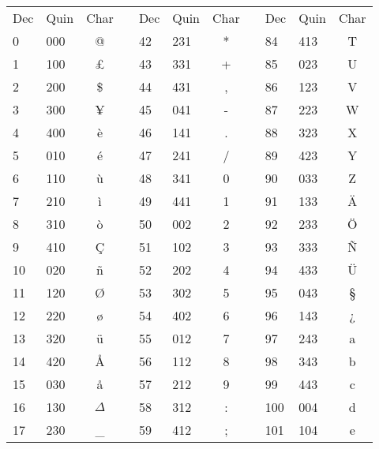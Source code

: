 \documentclass{article}
\begin{document}
{\begin{longtable}{|l|l|c|c|l|l|c|c|l|l|c|}
  \cline{1-3}
  \cline{5-7}
  \cline{9-11}
  Dec & Quin & Char & & Dec & Quin& Char& & Dec& Quin& Char\\
  \cline{1-3}
  \cline{5-7}
  \cline{9-11}
  0 & 000 & @ & & 42 & 231 & * & & 84 & 413 & T \\
  \cline{1-3}
  \cline{5-7}
  \cline{9-11}
  1 & 100 & £ & & 43 & 331 & + & & 85 & 023 & U \\
  \cline{1-3}
  \cline{5-7}
  \cline{9-11}
  2 & 200 & \$ & & 44 & 431 & , & & 86 & 123 & V \\
  \cline{1-3}
  \cline{5-7}
  \cline{9-11}
  3 & 300 & ¥ & & 45 & 041 & - & & 87 & 223 & W \\
  \cline{1-3}
  \cline{5-7}
  \cline{9-11}
  4 & 400 & è & & 46 & 141 & . & & 88 & 323 & X \\
  \cline{1-3}
  \cline{5-7}
  \cline{9-11}
  5 & 010 & é & & 47 & 241 & / & & 89 & 423 & Y \\
  \cline{1-3}
  \cline{5-7}
  \cline{9-11}
  6 & 110 & ù & & 48 & 341 & 0 & & 90 & 033 & Z \\
  \cline{1-3}
  \cline{5-7}
  \cline{9-11}
  7 & 210 & ì & & 49 & 441 & 1 & & 91 & 133 & Ä \\
  \cline{1-3}
  \cline{5-7}
  \cline{9-11}
  8 & 310 & ò & & 50 & 002 & 2 & & 92 & 233 & Ö \\
  \cline{1-3}
  \cline{5-7}
  \cline{9-11}
  9 & 410 & Ç & & 51 & 102 & 3 & & 93 & 333 & Ñ \\
  \cline{1-3}
  \cline{5-7}
  \cline{9-11}
  10 & 020 & ñ & & 52 & 202 & 4 & & 94 & 433 & Ü \\
  \cline{1-3}
  \cline{5-7}
  \cline{9-11}
  11 & 120 & Ø & & 53 & 302 & 5 & & 95 & 043 & § \\
  \cline{1-3}
  \cline{5-7}
  \cline{9-11}
  12 & 220 & ø & & 54 & 402 & 6 & & 96 & 143 & ¿ \\
  \cline{1-3}
  \cline{5-7}
  \cline{9-11}
  13 & 320 & ü & & 55 & 012 & 7 & & 97 & 243 & a \\
  \cline{1-3}
  \cline{5-7}
  \cline{9-11}
  14 & 420 & Å & & 56 & 112 & 8 & & 98 & 343 & b \\
  \cline{1-3}
  \cline{5-7}
  \cline{9-11}
  15 & 030 & å & & 57 & 212 & 9 & & 99 & 443 & c \\
  \cline{1-3}
  \cline{5-7}
  \cline{9-11}
  16 & 130 & $\Delta$ & & 58 & 312 & : & & 100 &004 & d \\
  \cline{1-3}
  \cline{5-7}
  \cline{9-11}
  17 & 230 & \_ & & 59 & 412 & ; & & 101 & 104 & e \\

\end{longtable}}
\end{document}
